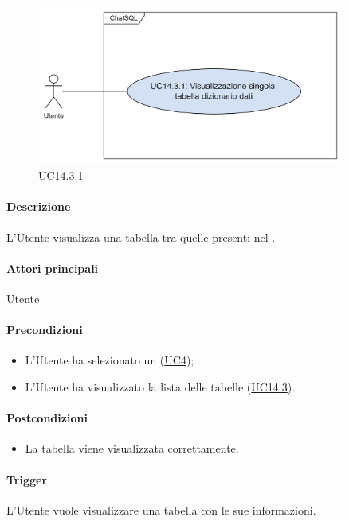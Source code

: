 \begin{figure}[H]
  \centering
  \includegraphics[width=0.90\textwidth]{assets/uc14_3_1.png}
  \caption{UC14.3.1}
\end{figure}

\paragraph*{Descrizione}
L'Utente visualizza una tabella tra quelle presenti nel .

\paragraph*{Attori principali}
Utente

\paragraph*{Precondizioni}
\begin{itemize}
  \item L'Utente ha selezionato un  (\hyperref[UC4]{UC4});
  \item L'Utente ha visualizzato la lista delle tabelle (\hyperref[UC14point3]{UC14.3}).
\end{itemize}

\paragraph*{Postcondizioni}
\begin{itemize}
  \item La tabella viene visualizzata correttamente.
\end{itemize}

\paragraph*{Trigger}
L'Utente vuole visualizzare una tabella con le sue informazioni.

